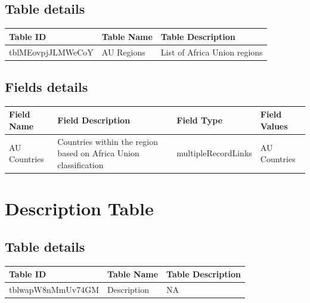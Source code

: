 \documentclass[
]{book}
\begin{document}
\hypertarget{table-details-2}{%
\subsection{Table details}\label{table-details-2}}

\begin{table}
\centering
\begin{tabular}{l|l|l}
\hline
\textbf{Table ID} & \textbf{Table Name} & \textbf{Table Description}\\
\hline
tblMEovpjJLMWeCoY & AU Regions & List of Africa Union regions\\
\hline
\end{tabular}
\end{table}

\hypertarget{fields-details-2}{%
\subsection{Fields details}\label{fields-details-2}}

\begin{table}
\centering
\begin{tabular}{l|l|l|l}
\hline
\textbf{Field Name} & \textbf{Field Description} & \textbf{Field Type} & \textbf{Field Values}\\
\hline
AU Countries & Countries within the region based on Africa Union classification & multipleRecordLinks & AU Countries\\
\hline
\end{tabular}
\end{table}

\hypertarget{description-table}{%
\section{Description Table}\label{description-table}}

\hypertarget{table-details-3}{%
\subsection{Table details}\label{table-details-3}}

\begin{table}
\centering
\begin{tabular}{l|l|l}
\hline
\textbf{Table ID} & \textbf{Table Name} & \textbf{Table Description}\\
\hline
tblwapW8nMmUv74GM & Description & NA\\
\hline
\end{tabular}
\end{table}
\end{document}
